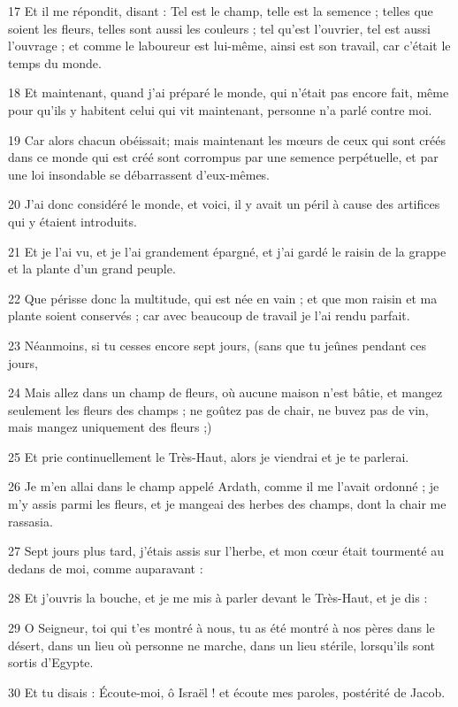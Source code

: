 \par 17 Et il me répondit, disant : Tel est le champ, telle est la semence ; telles que soient les fleurs, telles sont aussi les couleurs ; tel qu'est l'ouvrier, tel est aussi l'ouvrage ; et comme le laboureur est lui-même, ainsi est son travail, car c'était le temps du monde.
\par 18 Et maintenant, quand j'ai préparé le monde, qui n'était pas encore fait, même pour qu'ils y habitent celui qui vit maintenant, personne n'a parlé contre moi.
\par 19 Car alors chacun obéissait; mais maintenant les mœurs de ceux qui sont créés dans ce monde qui est créé sont corrompus par une semence perpétuelle, et par une loi insondable se débarrassent d'eux-mêmes.
\par 20 J'ai donc considéré le monde, et voici, il y avait un péril à cause des artifices qui y étaient introduits.
\par 21 Et je l'ai vu, et je l'ai grandement épargné, et j'ai gardé le raisin de la grappe et la plante d'un grand peuple.
\par 22 Que périsse donc la multitude, qui est née en vain ; et que mon raisin et ma plante soient conservés ; car avec beaucoup de travail je l'ai rendu parfait.
\par 23 Néanmoins, si tu cesses encore sept jours, (sans que tu jeûnes pendant ces jours,
\par 24 Mais allez dans un champ de fleurs, où aucune maison n'est bâtie, et mangez seulement les fleurs des champs ; ne goûtez pas de chair, ne buvez pas de vin, mais mangez uniquement des fleurs ;)
\par 25 Et prie continuellement le Très-Haut, alors je viendrai et je te parlerai.
\par 26 Je m'en allai dans le champ appelé Ardath, comme il me l'avait ordonné ; je m'y assis parmi les fleurs, et je mangeai des herbes des champs, dont la chair me rassasia.
\par 27 Sept jours plus tard, j'étais assis sur l'herbe, et mon cœur était tourmenté au dedans de moi, comme auparavant :
\par 28 Et j'ouvris la bouche, et je me mis à parler devant le Très-Haut, et je dis :
\par 29 O Seigneur, toi qui t'es montré à nous, tu as été montré à nos pères dans le désert, dans un lieu où personne ne marche, dans un lieu stérile, lorsqu'ils sont sortis d'Egypte.
\par 30 Et tu disais : Écoute-moi, ô Israël ! et écoute mes paroles, postérité de Jacob.
